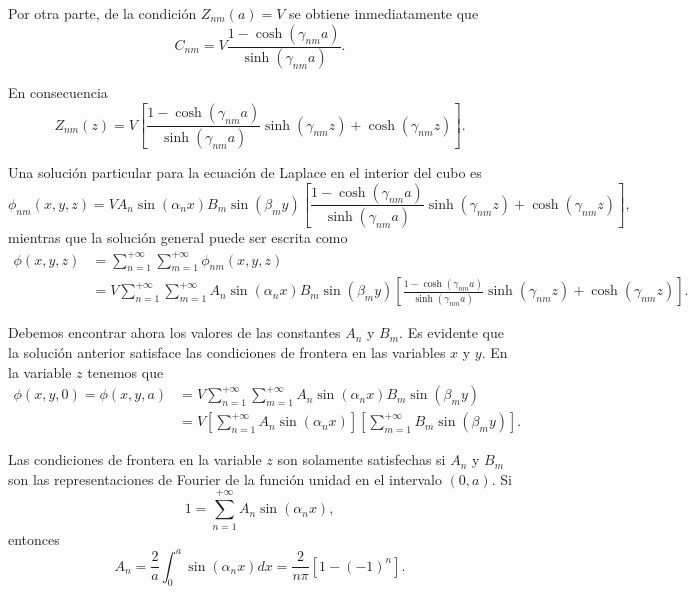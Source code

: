 \documentclass[12pt,a4paper]{book}
\begin{document}
Por otra parte, de la condición $Z_{nm}(a) = V$ se obtiene inmediatamente que
\begin{equation}
C_{nm} = V\frac{1 - \cosh(\gamma_{nm}a)}{\sinh(\gamma_{nm}a)}.
\end{equation}

En consecuencia
\begin{equation}
Z_{nm}(z) = V\left[\frac{1 - \cosh(\gamma_{nm}a)}{\sinh(\gamma_{nm}a)}\sinh(\gamma_{nm}z) + \cosh(\gamma_{nm}z)\right].
\end{equation}

Una solución particular para la ecuación de Laplace en el interior del cubo es
\begin{equation}
\phi_{nm}(x, y, z) = V A_n\sin(\alpha_n x)B_m\sin(\beta_m y)\left[\frac{1 - \cosh(\gamma_{nm}a)}{\sinh(\gamma_{nm}a)}\sinh(\gamma_{nm}z) + \cosh(\gamma_{nm}z)\right],
\end{equation}
mientras que la solución general puede ser escrita como
\begin{align}
\phi(x, y, z) &= \sum_{n=1}^{+\infty}\sum_{m=1}^{+\infty}\phi_{nm}(x, y, z) \\
&= V\sum_{n=1}^{+\infty}\sum_{m=1}^{+\infty}A_n\sin(\alpha_n x)B_m\sin(\beta_m y)\left[\frac{1 - \cosh(\gamma_{nm}a)}{\sinh(\gamma_{nm}a)}\sinh(\gamma_{nm}z) + \cosh(\gamma_{nm}z)\right].
\end{align}

Debemos encontrar ahora los valores de las constantes $A_n$ y $B_m$. Es evidente que la solución anterior satisface las condiciones de frontera en las variables $x$ y $y$. En la variable $z$ tenemos que
\begin{align}
\phi(x, y, 0) = \phi(x, y, a) &= V\sum_{n=1}^{+\infty}\sum_{m=1}^{+\infty}A_n\sin(\alpha_n x)B_m\sin(\beta_m y) \\
&= V\left[\sum_{n=1}^{+\infty}A_n\sin(\alpha_n x)\right]\left[\sum_{m=1}^{+\infty}B_m\sin(\beta_m y)\right].
\end{align}

Las condiciones de frontera en la variable $z$ son solamente satisfechas si $A_n$ y $B_m$ son las representaciones de Fourier de la función unidad en el intervalo $(0, a)$. Si
\begin{equation}
1 = \sum_{n=1}^{+\infty}A_n\sin(\alpha_n x),
\end{equation}
entonces
\begin{equation}
A_n = \frac{2}{a}\int_0^a\sin(\alpha_n x)dx = \frac{2}{n\pi}[1-(-1)^n].
\end{equation}
\end{document}
